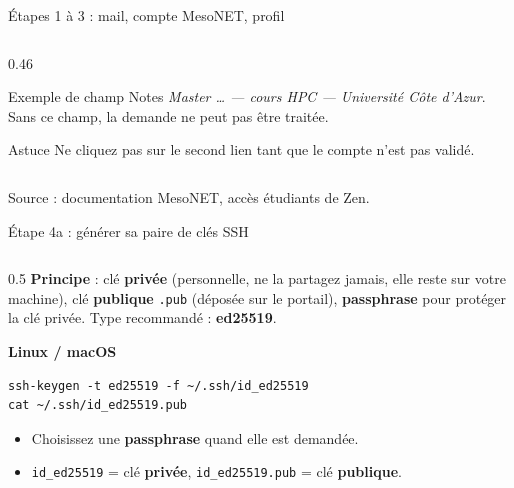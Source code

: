 \documentclass[8pt,aspectratio=169]{beamer}
\newcommand{\src}[1]{\vfill{\tiny\color{gray}Source : #1\par}}
\begin{document}
\begin{frame}{Étapes 1 à 3 : mail, compte MesoNET, profil}
\begin{columns}[T]
\begin{column}{0.46\textwidth}
\medskip
\begin{block}{Exemple de champ \og Notes \fg}
\emph{Master \dots{} --- cours HPC --- Université Côte d'Azur}. Sans ce champ, la demande ne peut pas être traitée.
\end{block}
\begin{exampleblock}{Astuce}
Ne cliquez pas sur le second lien tant que le compte n'est pas validé.
\end{exampleblock}
\end{column}
\end{columns}
\src{documentation MesoNET, \og accès étudiants \fg{} de Zen.}
\end{frame}

\begin{frame}[fragile]{Étape 4a : générer sa paire de clés SSH}
\begin{columns}[T]
\begin{column}{0.5\textwidth}
\textbf{Principe} : clé \textbf{privée} (personnelle, ne la partagez jamais, elle reste sur votre machine), clé \textbf{publique} \texttt{.pub} (déposée sur le portail), \textbf{passphrase} pour protéger la clé privée. Type recommandé : \textbf{ed25519}.

\medskip
\textbf{Linux / macOS}
\begin{verbatim}
ssh-keygen -t ed25519 -f ~/.ssh/id_ed25519
cat ~/.ssh/id_ed25519.pub
\end{verbatim}
\begin{itemize}
\item Choisissez une \textbf{passphrase} quand elle est demandée.
\item \texttt{id\_ed25519} = clé \textbf{privée}, \texttt{id\_ed25519.pub} = clé \textbf{publique}.
\end{itemize}


\end{column}
\end{columns}
\end{frame}
\end{document}
